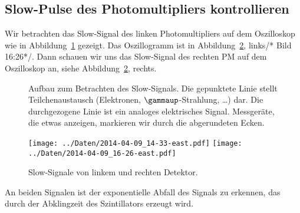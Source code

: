 \subsection{Slow-Pulse des Photomultipliers kontrollieren}

Wir betrachten das Slow-Signal des linken Photomultipliers auf dem Oszilloskop
wie in Abbildung~\ref{fig:aufbau:slow} gezeigt. Das Oszillogramm ist in
Abbildung~\ref{fig:slow_signal}, links/* Bild 16:26*/. Dann schauen wir uns das
Slow-Signal des rechten PM auf dem Oszilloskop an, siehe
Abbildung~\ref{fig:slow_signal}, rechts.

\begin{figure}[htbp]
    \centering
    \caption{%
        Aufbau zum Betrachten des Slow-Signals. Die gepunktete Linie stellt
        Teilchenaustausch (Elektronen, $\gammaup$-Strahlung, …) dar. Die
        durchgezogene Linie ist ein analoges elektrisches Signal. Messgeräte,
        die etwas anzeigen, markieren wir durch die abgerundeten Ecken.
    }
    \label{fig:aufbau:slow}
\end{figure}

\begin{figure}[htbp]
    \centering
    \texttt{[image: ../Daten/2014-04-09\_14-33-east.pdf]}
    \hfill
    \texttt{[image: ../Daten/2014-04-09\_16-26-east.pdf]}
    \caption{%
        Slow-Signale von linkem und rechten Detektor.
    }
    \label{fig:slow_signal}
\end{figure}

An beiden Signalen ist der exponentielle Abfall des Signals zu erkennen, das
durch der Abklingzeit des Szintillators erzeugt wird.


